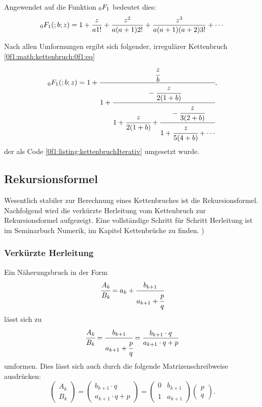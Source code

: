 Angewendet auf die Funktion $\mathstrut_0F_1$ bedeutet dies:
\begin{equation*}
	\mathstrut_0F_1(;b;z) = 1 + \frac{z}{a1!} + \frac{z^2}{a(a+1)2!} + \frac{z^3}{a(a+1)(a+2)3!} + \cdots
\end{equation*}
\cite{0f1:wiki-fraction}

Nach allen Umformungen ergibt sich folgender, irregulärer Kettenbruch \eqref{0f1:math:kettenbruch:0f1:eq}
\begin{equation}
	\label{0f1:math:kettenbruch:0f1:eq}
	\mathstrut_0F_1(;b;z) = 1 + \cfrac{\cfrac{z}{b}}{1+\cfrac{-\cfrac{z}{2(1+b)}}{1+\cfrac{z}{2(1+b)}+\cfrac{-\cfrac{z}{3(2+b)}}{1+\cfrac{z}{5(4+b)} + \cdots}}},
\end{equation}
der als Code \ref{0f1:listing:kettenbruchIterativ} umgesetzt wurde. 
\cite{0f1:wolfram-0f1}



\subsection{Rekursionsformel
\label{0f1:subsection:rekursionsformel}}
Wesentlich stabiler zur Berechnung eines Kettenbruches ist die Rekursionsformel. Nachfolgend wird die verkürzte Herleitung vom Kettenbruch zur Rekursionsformel aufgezeigt. Eine vollständige Schritt für Schritt Herleitung ist im Seminarbuch Numerik, im Kapitel Kettenbrüche zu finden. \cite{0f1:kettenbrueche})

\subsubsection{Verkürzte Herleitung}
Ein Näherungsbruch in der Form
\begin{align*}
	\cfrac{A_k}{B_k} = a_k + \cfrac{b_{k + 1}}{a_{k + 1} + \cfrac{p}{q}}
\end{align*}
lässt sich zu
\begin{align*}
	\cfrac{A_k}{B_k} = \cfrac{b_{k+1}}{a_{k+1} + \cfrac{p}{q}} = \frac{b_{k+1} \cdot q}{a_{k+1} \cdot q + p}
\end{align*}
umformen.
Dies lässt sich auch durch die folgende Matrizenschreibweise ausdrücken:
\begin{equation*}
	\begin{pmatrix}
		A_k\\
		B_k
	\end{pmatrix}
	= 		\begin{pmatrix}
		b_{k+1} \cdot q\\
		a_{k+1} \cdot q + p
	\end{pmatrix}
	=\begin{pmatrix}
		0&	b_{k+1}\\
		1&	a_{k+1}
	\end{pmatrix}
	\begin{pmatrix}
		p \\
		q
	\end{pmatrix}.
\end{equation*}

